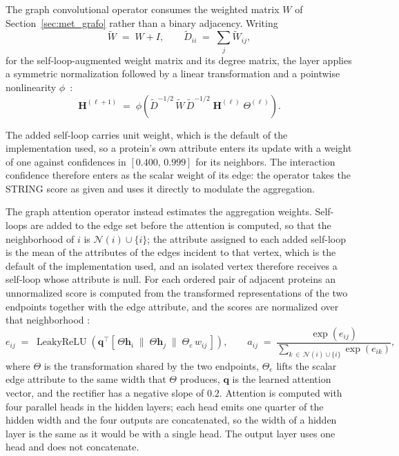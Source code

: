 \documentclass[Ingles]{ic-tese-v3}
\begin{document}
The graph convolutional operator consumes the weighted matrix $W$ of
Section~\ref{sec:met_grafo} rather than a binary adjacency. Writing
\begin{equation}
  \tilde{W} \;=\; W + I,
  \qquad
  \tilde{D}_{ii} \;=\; \sum_{j} \tilde{W}_{ij},
  \label{eq:met_gcn_norm}
\end{equation}
\noindent for the self-loop-augmented weight matrix and its degree matrix, the layer applies a symmetric
normalization followed by a linear transformation and a pointwise nonlinearity $\phi$~\cite{kipf2017semi}:
\begin{equation}
  \mathbf{H}^{(\ell+1)} \;=\;
  \phi\!\left( \tilde{D}^{-1/2}\,\tilde{W}\,\tilde{D}^{-1/2}\;\mathbf{H}^{(\ell)}\;\Theta^{(\ell)} \right).
  \label{eq:met_gcn}
\end{equation}

The added self-loop carries unit weight, which is the default of the implementation used, so a
protein's own attribute enters its update with a weight of one against confidences in
$[0.400,\,0.999]$ for its neighbors. The interaction confidence therefore enters as the scalar
weight
of its edge: the operator takes the STRING score as given and uses it directly to modulate the
aggregation.

The graph attention operator instead estimates the aggregation weights. Self-loops are added to the
edge set before the attention is computed, so that the neighborhood of $i$ is
$\mathcal{N}(i) \cup \{i\}$; the attribute assigned to each added self-loop is the mean of the
attributes of the edges incident to that vertex, which is the default of the implementation used,
and
an isolated vertex therefore receives a self-loop whose attribute is null. For each ordered pair of
adjacent proteins an unnormalized score is computed from the transformed representations of the two
endpoints together with the edge attribute, and the scores are normalized over that neighborhood
\cite{velickovic2018graph}:
\begin{equation}
  e_{ij} \;=\; \operatorname{LeakyReLU}\!\left(
      \mathbf{q}^{\top}
      \left[\, \Theta \mathbf{h}_i \;\big\|\; \Theta \mathbf{h}_j \;\big\|\; \Theta_e\, w_{ij} \,\right]
    \right),
  \qquad
  a_{ij} \;=\; \frac{\exp(e_{ij})}
  {\displaystyle\sum_{k \,\in\, \mathcal{N}(i) \cup \{i\}} \exp(e_{ik})},
  \label{eq:met_gat}
\end{equation}
\noindent where $\Theta$ is the transformation shared by the two endpoints,
$\Theta_e$ lifts the scalar edge attribute to the same width that $\Theta$ produces,
$\mathbf{q}$
is the learned attention vector, and the rectifier has a negative slope of $0.2$.
Attention is
computed with four parallel heads in the hidden layers; each head emits one quarter of the hidden
width and the four outputs are concatenated, so the width of a hidden layer is the same as it would
be with a single head. The output layer uses one head and does not concatenate.
\end{document}
